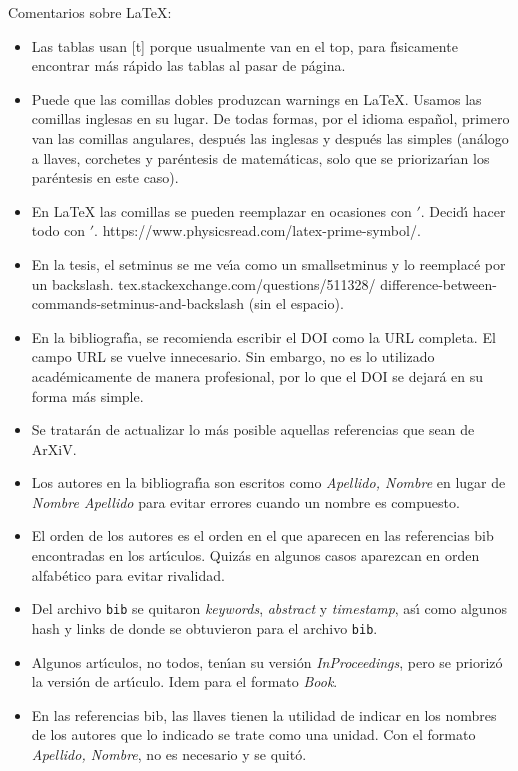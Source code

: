 Comentarios sobre LaTeX:
\begin{itemize}
    \item Las tablas usan [t] porque usualmente van en el top, para f\'{\i}sicamente encontrar m\'as r\'apido las tablas al pasar de p\'agina.
    \item Puede que las comillas dobles produzcan warnings en LaTeX. Usamos las comillas inglesas en su lugar. De todas formas, por el idioma espa\~nol, primero van las comillas angulares, despu\'es las inglesas y despu\'es las simples (an\'alogo a llaves, corchetes y par\'entesis de matem\'aticas, solo que se priorizar\'{\i}an los par\'entesis en este caso).
    \item En LaTeX las comillas se pueden reemplazar en ocasiones con \(\prime\). Decid\'{\i} hacer todo con \(\prime\). https://www.physicsread.com/latex-prime-symbol/.
    \item En la tesis, el setminus se me ve\'{\i}a como un smallsetminus y lo reemplac\'e por un backslash. tex.stackexchange.com/questions/511328/ difference-between-commands-setminus-and-backslash (sin el espacio).
    \item En la bibliograf\'{\i}a, se recomienda escribir el DOI como la URL completa. El campo URL se vuelve innecesario. Sin embargo, no es lo utilizado académicamente de manera profesional, por lo que el DOI se dejará en su forma más simple.
    \item Se tratarán de actualizar lo m\'as posible aquellas referencias que sean de ArXiV.
    \item Los autores en la bibliograf\'{\i}a son escritos como \emph{Apellido, Nombre} en lugar de \emph{Nombre Apellido} para evitar errores cuando un nombre es compuesto.
    \item El orden de los autores es el orden en el que aparecen en las referencias bib encontradas en los art\'{\i}culos. Quiz\'as en algunos casos aparezcan en orden alfab\'etico para evitar rivalidad.
    \item Del archivo \texttt{bib} se quitaron \emph{keywords}, \emph{abstract} y \emph{timestamp}, as\'{\i} como algunos hash y links de donde se obtuvieron para el archivo \texttt{bib}.
    \item Algunos art\'{\i}culos, no todos, ten\'{\i}an su versi\'on \emph{InProceedings}, pero se prioriz\'o la versi\'on de art\'{\i}culo. Idem para el formato \emph{Book}.
    \item En las referencias bib, las llaves tienen la utilidad de indicar en los nombres de los autores que lo indicado se trate como una unidad. Con el formato \emph{Apellido, Nombre}, no es necesario y se quitó.

\end{itemize}
